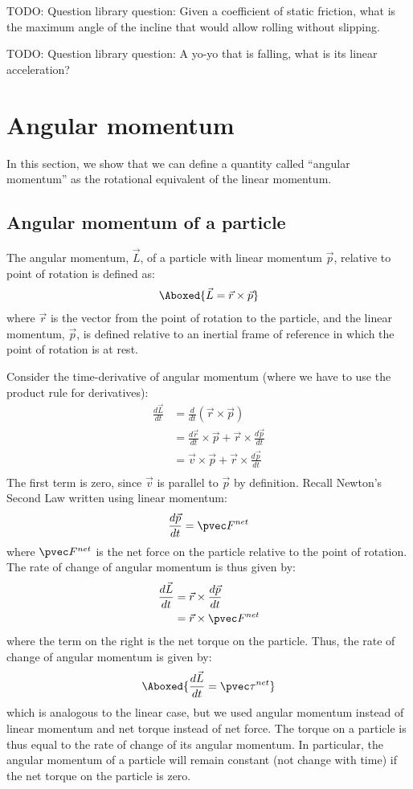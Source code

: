 TODO: Question library question: Given a coefficient of static friction, what is the maximum angle of the incline that would allow rolling without slipping.

TODO: Question library question: A yo-yo that is falling, what is its linear acceleration?

\section{Angular momentum}
In this section, we show that we can define a quantity called ``angular momentum'' as the rotational equivalent of the linear momentum.
\subsection{Angular momentum of a particle}
The angular momentum, $\vec L$, of a particle with linear momentum $\vec p$, relative to point of rotation is defined as:
\begin{align}
\Aboxed{\vec L = \vec r\times \vec p}
\end{align}
where $\vec r$ is the vector from the point of rotation to the particle, and the linear momentum, $\vec p$, is defined relative to an inertial frame of reference in which the point of rotation is at rest.

Consider the time-derivative of angular momentum (where we have to use the product rule for derivatives):
\begin{align*}
\frac{d\vec L}{dt}  &= \frac{d}{dt} (\vec r\times \vec p)\\
&=\frac{d\vec r}{dt}\times \vec p + \vec r\times\frac{d\vec p}{dt}\\
&=\vec v\times \vec p + \vec r\times\frac{d\vec p}{dt}\\
\end{align*}
The first term is zero, since $\vec v$ is parallel to $\vec p$ by definition. Recall Newton's Second Law written using linear momentum:
\begin{align*}
\frac{d\vec p}{dt} = \pvec F^{net}
\end{align*}
where $\pvec F^{net}$ is the net force on the particle relative to the point of rotation. The rate of change of angular momentum is thus given by:
\begin{align*}
\frac{d\vec L }{dt} &= \vec r\times\frac{d\vec p}{dt}\\
&=\vec r\times\pvec F^{net}
\end{align*}
where the term on the right is the net torque on the particle. Thus, the rate of change of angular momentum is given by:
\begin{align}
\Aboxed{\frac{d\vec L}{dt}   = \pvec \tau^{net}}
\end{align}
which is analogous to the linear case, but we used angular momentum instead of linear momentum and net torque instead of net force. The torque on a particle is thus equal to the rate of change of its angular momentum. In particular, the angular momentum of a particle will remain constant (not change with time) if the net torque on the particle is zero. 

